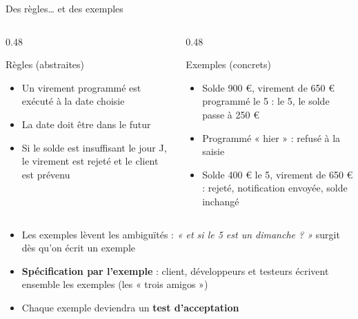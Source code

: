 \documentclass[aspectratio=169,10pt]{beamer}
\begin{document}
\begin{frame}{Des règles\ldots{} et des exemples}
  \begin{columns}[T]
    \begin{column}{0.48\textwidth}
      \begin{block}{Règles (abstraites)}
        \small
        \begin{itemize}
          \item Un virement programmé est exécuté à la date choisie
          \item La date doit être dans le futur
          \item Si le solde est insuffisant le jour J, le virement est rejeté et le client est prévenu
        \end{itemize}
      \end{block}
    \end{column}
    \begin{column}{0.48\textwidth}
      \begin{exampleblock}{Exemples (concrets)}
        \small
        \begin{itemize}
          \item Solde 900 \euro{}, virement de 650 \euro{} programmé le 5 : le 5, le solde passe à 250 \euro{}
          \item Programmé « hier » : refusé à la saisie
          \item Solde 400 \euro{} le 5, virement de 650 \euro{} : rejeté, notification envoyée, solde inchangé
        \end{itemize}
      \end{exampleblock}
    \end{column}
  \end{columns}
  \vspace{3mm}
  \begin{itemize}
    \item Les exemples lèvent les ambiguïtés : \textit{« et si le 5 est un dimanche ? »} surgit dès qu'on écrit un exemple
    \item \textbf{Spécification par l'exemple} : client, développeurs et testeurs écrivent ensemble les exemples (les « trois amigos »)
    \item Chaque exemple deviendra un \textbf{test d'acceptation}
  \end{itemize}
\end{frame}
\end{document}
